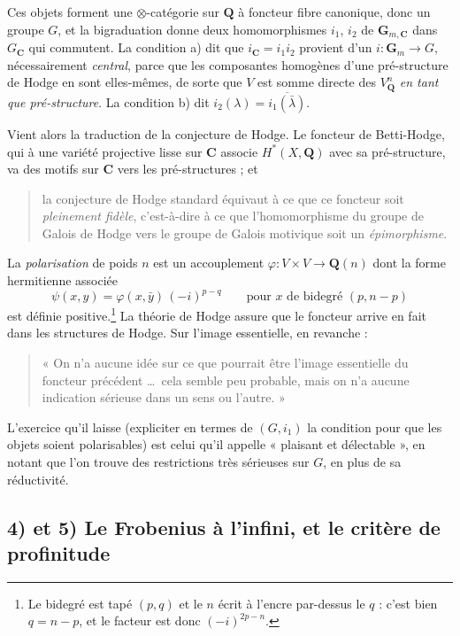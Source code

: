 \documentclass[11pt,a4paper]{article}
\begin{document}
Ces objets forment une $\otimes$-catégorie sur $\mathbf{Q}$ à foncteur fibre
canonique, donc un groupe $G$, et la bigraduation donne deux homomorphismes
$i_{1}$, $i_{2}$ de $\mathbf{G}_{m,\mathbf{C}}$ dans $G_{\mathbf{C}}$ qui
commutent. La condition a) dit que $i_{\mathbf{C}} = i_{1}i_{2}$ provient d'un
$i \colon \mathbf{G}_{m} \to G$, nécessairement \emph{central}, parce que les
composantes homogènes d'une pré-structure de Hodge en sont elles-mêmes, de
sorte que $V$ est somme directe des $V^{n}_{\mathbf{Q}}$ \emph{en tant que
pré-structure}. La condition b) dit $i_{2}(\lambda) =
\overline{i_{1}(\bar{\lambda})}$.

Vient alors la traduction de la conjecture de Hodge. Le foncteur de
Betti-Hodge, qui à une variété projective lisse sur $\mathbf{C}$ associe
$H^{*}(X, \mathbf{Q})$ avec sa pré-structure, va des motifs sur $\mathbf{C}$
vers les pré-structures ; et
\begin{quote}
la conjecture de Hodge standard équivaut à ce que ce foncteur soit
\emph{pleinement fidèle}, c'est-à-dire à ce que l'homomorphisme du groupe de
Galois de Hodge vers le groupe de Galois motivique soit un \emph{épimorphisme}.
\end{quote}
La \emph{polarisation} de poids $n$ est un accouplement $\varphi \colon V
\times V \to \mathbf{Q}(n)$ dont la forme hermitienne associée
\[
\psi(x,y) = \varphi(x, \bar{y})\,(-i)^{p-q}
\qquad\text{pour } x \text{ de bidegré } (p, n-p)
\]
est définie positive.\footnote{Le bidegré est tapé $(p,q)$ et le $n$ écrit à
l'encre par-dessus le $q$ : c'est bien $q = n - p$, et le facteur est donc
$(-i)^{2p-n}$.} La théorie de Hodge assure que le foncteur arrive en fait dans
les structures de Hodge. Sur l'image essentielle, en revanche :
\begin{quote}
« On n'a aucune idée sur ce que pourrait être l'image essentielle du foncteur
précédent \ldots\ cela semble peu probable, mais on n'a aucune indication
sérieuse dans un sens ou l'autre. »
\end{quote}
L'exercice qu'il laisse (expliciter en termes de $(G, i_{1})$ la
condition pour que les objets soient polarisables) est celui qu'il appelle
« plaisant et délectable », en notant que l'on trouve des restrictions très
sérieuses sur $G$, en plus de sa réductivité.

\subsection*{4) et 5) Le Frobenius à l'infini, et le critère de profinitude}
\end{document}
